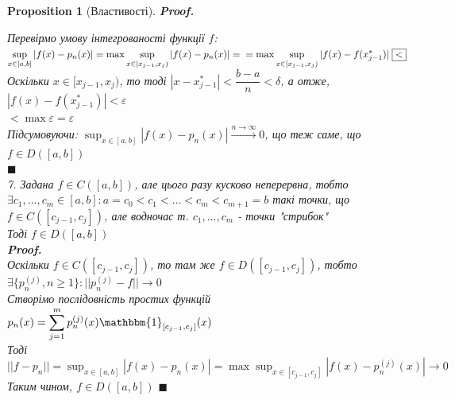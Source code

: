 \documentclass[a4paper, 14pt]{extarticle}
\def\huge{\displaystyle}
\def\bigline{\vspace{5mm}\\}
\theoremstyle{theoremdd}
\theoremstyle{theoremdd}
\theoremstyle{theoremdd}
\theoremstyle{theoremdd}
\theoremstyle{theoremdd}
\newtheorem{proposition}[theorem]{Proposition}
\theoremstyle{theoremdd}
\theoremstyle{theoremdd}
\theoremstyle{theoremdd}
\newenvironment{pfNoTh}{\textbf{Proof. \\}}{$\blacksquare$}
\begin{document}
\begin{proposition}[Властивості]
\begin{pfNoTh}
\begin{figure}[H]
\end{figure}

Перевірмо умову інтегрованості функції $f$:\\
$\huge \sup_{x \in [a,b]} |f(x) - p_n(x)| = \max \sup_{x \in [x_{j-1}, x_j)} |f(x) - p_n(x)| = \\ = \max \sup_{x \in [x_{j-1}, x_j)} |f(x) - f(x_{j-1}^*)| \hspace{0.1cm} \boxed{<}$\\
Оскільки $x \in [x_{j-1}, x_j)$, то тоді $|x - x_{j-1}^*| < \dfrac{b-a}{n} < \delta$, а отже,\\ $|f(x) - f(x_{j-1}^*)| < \varepsilon$\\
$\boxed{<} \max \varepsilon = \varepsilon$\\
Підсумовуючи: $\huge \sup_{x \in [a,b]} |f(x) - p_n(x)| \overset{n \to \infty}{\longrightarrow} 0$, що теж саме, що $f \in D([a,b])$\\
\end{pfNoTh}
\bigline

7. Задана $f \in C([a,b])$, але цього разу кусково неперервна, тобто\\
$\exists c_1,\dots,c_m \in [a,b]: a=c_0 < c_1 < \dots < c_m < c_{m+1} = b$ такі точки, що $f \in C([c_{j-1}, c_j])$, але водночас т. $c_1,\dots,c_m$ - точки "стрибок" \\
Тоді $f \in D([a,b])$\\
\begin{pfNoTh}
Оскільки $f \in C([c_{j-1}, c_j])$, то там же $f \in D([c_{j-1},c_j])$, тобто \\ $\exists \{p_n^{(j)}, n \geq 1\}: ||p_n^{(j)} - f|| \to 0$\\
Створімо послідовність простих функцій $p_n(x) = \huge\sum_{j=1}^m p_n^{(j)}(x) \mathbbm{1}_{[c_{j-1}, c_j]}(x)$\\
Тоді $||f-p_n|| = \huge \sup_{x \in [a,b]} |f(x) - p_n(x)| = \max \sup_{x \in [c_{j-1}, c_j]} |f(x) - p_n^{(j)}(x)| \to 0$\\
Таким чином, $f \in D([a,b])$
\end{pfNoTh}
\bigline

\end{proposition}
\end{document}
